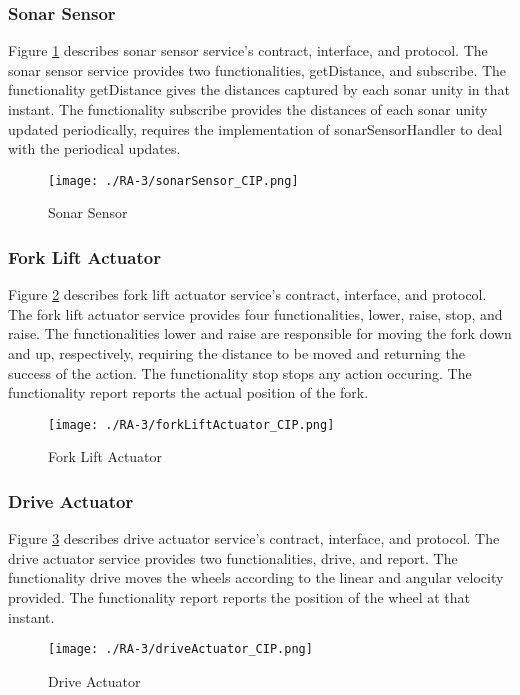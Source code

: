 \subsubsection{Sonar Sensor} %
Figure \ref{fig:sonarsensor_cip} describes sonar sensor service's contract, interface, and protocol. The sonar sensor service provides two functionalities, getDistance, and subscribe. The functionality getDistance gives the distances captured by each sonar unity in that instant. The functionality subscribe provides the distances of each sonar unity updated periodically, requires the implementation of sonarSensorHandler to deal with the periodical updates.
\begin{figure}[ht!]
 \centering
 \texttt{[image: ./RA-3/sonarSensor\_CIP.png]}
 \caption{Sonar Sensor}
 \label{fig:sonarsensor_cip}
\end{figure}

\subsubsection{Fork Lift Actuator} %
Figure \ref{fig:forkliftactuator_cip} describes fork lift actuator service's contract, interface, and protocol. The fork lift actuator service provides four functionalities, lower, raise, stop, and raise. The functionalities lower and raise are responsible for moving the fork down and up, respectively, requiring the distance to be moved and returning the success of the action. The functionality stop stops any action occuring. The functionality report reports the actual position of the fork.
\begin{figure}[ht!]
 \centering
 \texttt{[image: ./RA-3/forkLiftActuator\_CIP.png]}
 \caption{Fork Lift Actuator}
 \label{fig:forkliftactuator_cip}
\end{figure}

\subsubsection{Drive Actuator} %
Figure \ref{fig:driveactuator_cip} describes drive actuator service's contract, interface, and protocol. The drive actuator service provides two functionalities, drive, and report. The functionality drive moves the wheels according to the linear and angular velocity provided. The functionality report reports the position of the wheel at that instant.
\begin{figure}[ht!]
 \centering
 \texttt{[image: ./RA-3/driveActuator\_CIP.png]}
 \caption{Drive Actuator}
 \label{fig:driveactuator_cip}
\end{figure}

